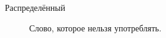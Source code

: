 \Defines %
\begin{description}
\item[Распределённый] Слово, которое нельзя употреблять.
\end{description}

